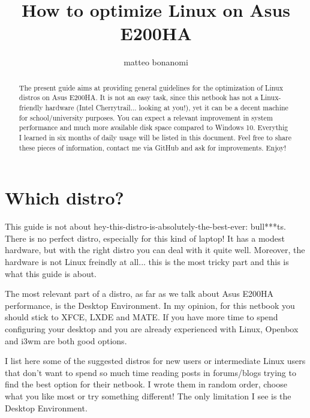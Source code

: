 \documentclass{article}
\begin{document}
\title{How to optimize Linux on Asus E200HA}
\author{matteo bonanomi}


\maketitle

\begin{abstract}
The present guide aims at providing general guidelines for the optimization of Linux distros on Asus E200HA. It is not an easy task, since this netbook has not a Linux-friendly hardware (Intel Cherrytrail... looking at you!), yet it can be a decent machine for school/university purposes. You can expect a relevant improvement in system performance and much more available disk space compared to Windows 10. Everythig I learned in six months of daily usage will be listed in this document. Feel free to share these pieces of information, contact me via GitHub and ask for improvements. Enjoy!  
\end{abstract}

\tableofcontents

\newpage


\section{Which distro?}
This guide is not about hey-this-distro-is-absolutely-the-best-ever: bull***ts. There is no perfect distro, especially for this kind of laptop! It has a modest hardware, but with the right distro you can deal with it quite well. Moreover, the hardware is not Linux freindly at all... this is the most tricky part and this is what this guide is about.

The most relevant part of a distro, as far as we talk about Asus E200HA performance, is the Desktop Environment. In my opinion, for this netbook you should stick to XFCE, LXDE and MATE. If you have more time to spend configuring your desktop and you are already experienced with Linux, Openbox and i3wm are both good options. 

I list here some of the suggested distros for new users or intermediate Linux users that don't want to spend so much time reading posts in forums/blogs trying to find the best option for their netbook. I wrote them in random order, choose what you like most or try something different! The only limitation I see is the Desktop Environment. 
\end{document}
